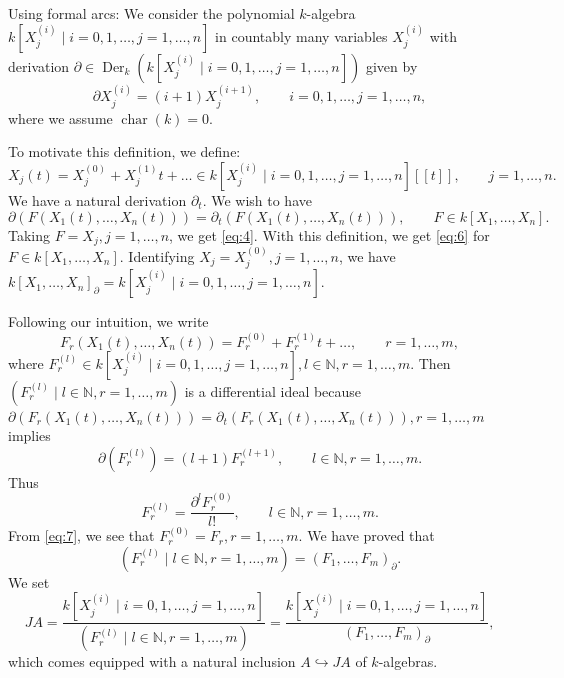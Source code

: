 \documentclass[a4paper, 12pt]{amsart}
\theoremstyle{remark}
\begin{document}
Using formal arcs: We consider the polynomial $k$-algebra $k[X^{(i)}_j \mid i = 0, 1, \dots, j = 1, \dots, n]$ in countably many variables $X^{(i)}_j$ with derivation $\partial \in \operatorname{Der}_k(k[X^{(i)}_j \mid i = 0, 1, \dots, j = 1, \dots, n])$ given by
\begin{equation}
  \label{eq:4}
  \partial X^{(i)}_j = (i + 1)X^{(i + 1)}_j, \qquad i = 0, 1, \dots, j = 1, \dots, n,
\end{equation}
where we assume $\operatorname{char}(k) = 0$.

To motivate this definition, we define:
\begin{equation}
  \label{eq:5}
  X_j(t) = X_j^{(0)} + X_j^{(1)}t + \dots \in k[X^{(i)}_j \mid i = 0, 1, \dots, j = 1, \dots, n][[t]], \qquad j = 1, \dots, n.
\end{equation}
We have a natural derivation $\partial_t$.
We wish to have
\begin{equation}
  \label{eq:6}
  \partial(F(X_1(t), \dots, X_n(t))) = \partial_t(F(X_1(t), \dots, X_n(t))), \qquad F \in k[X_1, \dots, X_n].
\end{equation}
Taking $F = X_j, j = 1, \dots, n$, we get \eqref{eq:4}.
With this definition, we get \eqref{eq:6} for $F \in k[X_1, \dots, X_n]$.
Identifying $X_j = X^{(0)}_j, j = 1, \dots, n$, we have $k[X_1, \dots, X_n]_\partial = k[X^{(i)}_j \mid i = 0, 1, \dots, j = 1, \dots, n]$.

Following our intuition, we write
\begin{equation}
  \label{eq:7}
  F_r(X_1(t), \dots, X_n(t)) = F_r^{(0)} + F_r^{(1)}t + \dots, \qquad r = 1, \dots, m,
\end{equation}
where $F_r^{(l)} \in k[X^{(i)}_j \mid i = 0, 1, \dots, j = 1, \dots, n], l \in \mathbb{N}, r = 1, \dots, m$.
Then $(F^{(l)}_r \mid l \in \mathbb{N}, r = 1, \dots, m)$ is a differential ideal because $\partial(F_r(X_1(t), \dots, X_n(t))) = \partial_t(F_r(X_1(t), \dots, X_n(t))), r = 1, \dots, m$ implies
\begin{equation*}
  \partial(F_r^{(l)}) = (l + 1)F_r^{(l + 1)}, \qquad l \in \mathbb{N}, r = 1, \dots, m.
\end{equation*}
Thus
\begin{equation*}
  F_r^{(l)} = \frac{\partial^lF_r^{(0)}}{l!}, \qquad l \in \mathbb{N}, r = 1, \dots, m.
\end{equation*}
From \eqref{eq:7}, we see that $F_r^{(0)} = F_r, r = 1, \dots, m$.
We have proved that
\begin{equation*}
  (F^{(l)}_r \mid l \in \mathbb{N}, r = 1, \dots, m) = (F_1, \dots, F_m)_\partial.
\end{equation*}
We set
\begin{equation}
  \label{eq:8}
  J A = \frac{k[X^{(i)}_j \mid i = 0, 1, \dots, j = 1, \dots, n]}{(F^{(l)}_r \mid l \in \mathbb{N}, r = 1, \dots, m)} = \frac{k[X^{(i)}_j \mid i = 0, 1, \dots, j = 1, \dots, n]}{(F_1, \dots, F_m)_\partial},
\end{equation}
which comes equipped with a natural inclusion $A \hookrightarrow J A$ of $k$-algebras.
\end{document}

